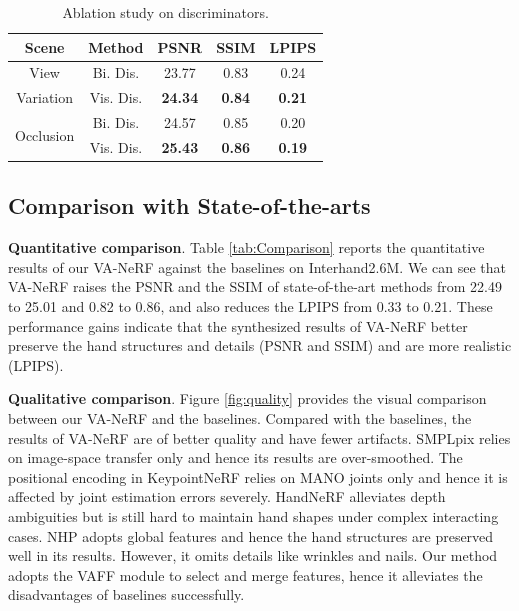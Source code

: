 \documentclass[letterpaper]{article} %
\begin{document}
\begin{table}[t]
\centering
\caption{Ablation study on discriminators.}
\label{tab:disc}
\begin{tabular}{ccccc}
\toprule
Scene  & Method & PSNR    & SSIM    & LPIPS     \\
\midrule
View & Bi. Dis. &  23.77  &  0.83  &  0.24  \\ \cline{2-5}
Variation & Vis. Dis.  &  \textbf{24.34}  &  \textbf{0.84}   &  \textbf{0.21}     \\ \hline
\multirow[c]{2}{*}{Occlusion} & Bi. Dis. &  24.57  &  0.85  &  0.20  \\ \cline{2-5}
 & Vis. Dis.  &  \textbf{25.43}   &  \textbf{0.86}  &  \textbf{0.19}    \\
\bottomrule
\end{tabular}
\end{table}



\subsection{Comparison with State-of-the-arts}

\textbf{Quantitative comparison}. Table \ref{tab:Comparison} reports the quantitative results of our VA-NeRF against the baselines on Interhand2.6M. We can see that VA-NeRF raises the PSNR and the SSIM of state-of-the-art methods from 22.49 to 25.01 and 0.82 to 0.86, and also reduces the LPIPS from 0.33 to 0.21. These performance gains indicate that the synthesized results of VA-NeRF better preserve the hand structures and details (PSNR and SSIM) and are more realistic (LPIPS).

\noindent\textbf{Qualitative comparison}. Figure \ref{fig:quality} provides the visual comparison between our VA-NeRF and the baselines. Compared with the baselines, the results of VA-NeRF are of better quality and have fewer artifacts. SMPLpix relies on image-space transfer only and hence its results are over-smoothed. The positional encoding in KeypointNeRF relies on MANO joints only and hence it is affected by joint estimation errors severely. HandNeRF alleviates depth ambiguities but is still hard to maintain hand shapes under complex interacting cases. NHP adopts global features and hence the hand structures are preserved well in its results. However, it omits details like wrinkles and nails. Our method adopts the VAFF module to select and merge features, hence it alleviates the disadvantages of baselines successfully.
\end{document}
